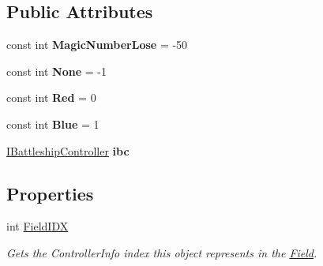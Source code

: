 \subsection*{Public Attributes}
\begin{DoxyCompactItemize}
\item 
\hypertarget{class_m_b_c_1_1_core_1_1_controller_a29351ae676e8ce5304b2e1ec66e7e22f}{const int {\bfseries Magic\-Number\-Lose} = -\/50}\label{class_m_b_c_1_1_core_1_1_controller_a29351ae676e8ce5304b2e1ec66e7e22f}

\item 
\hypertarget{class_m_b_c_1_1_core_1_1_controller_ab10b5467602d56dc80aeb35e5e66db5d}{const int {\bfseries None} = -\/1}\label{class_m_b_c_1_1_core_1_1_controller_ab10b5467602d56dc80aeb35e5e66db5d}

\item 
\hypertarget{class_m_b_c_1_1_core_1_1_controller_a33fde9e88903944490e2630d1d74c76c}{const int {\bfseries Red} = 0}\label{class_m_b_c_1_1_core_1_1_controller_a33fde9e88903944490e2630d1d74c76c}

\item 
\hypertarget{class_m_b_c_1_1_core_1_1_controller_a0481b13142297921fd0965024dc2d7ab}{const int {\bfseries Blue} = 1}\label{class_m_b_c_1_1_core_1_1_controller_a0481b13142297921fd0965024dc2d7ab}

\item 
\hypertarget{class_m_b_c_1_1_core_1_1_controller_ab56cab183d1d2e91940839b3556a7cf3}{\hyperlink{interface_m_b_c_1_1_core_1_1_i_battleship_controller}{I\-Battleship\-Controller} {\bfseries ibc}}\label{class_m_b_c_1_1_core_1_1_controller_ab56cab183d1d2e91940839b3556a7cf3}

\end{DoxyCompactItemize}
\subsection*{Properties}
\begin{DoxyCompactItemize}
\item 
\hypertarget{class_m_b_c_1_1_core_1_1_controller_a226d1c9b6006d0f3489669fdc6eaf381}{int \hyperlink{class_m_b_c_1_1_core_1_1_controller_a226d1c9b6006d0f3489669fdc6eaf381}{Field\-I\-D\-X}}\label{class_m_b_c_1_1_core_1_1_controller_a226d1c9b6006d0f3489669fdc6eaf381}

\begin{DoxyCompactList}\small\item\em Gets the Controller\-Info index this object represents in the \hyperlink{class_m_b_c_1_1_core_1_1_field}{Field}.\end{DoxyCompactList}\end{DoxyCompactItemize}


